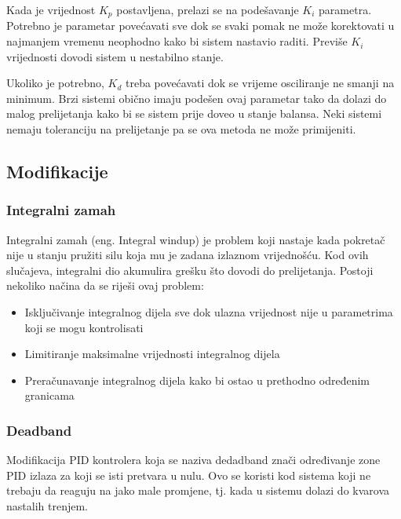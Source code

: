 \documentclass[../Document.tex]{subfiles}
\begin{document}

\noindent Kada je vrijednost $K_p$ postavljena, prelazi se na podešavanje $K_i$ parametra. Potrebno je parametar povećavati sve dok se svaki pomak ne može korektovati u najmanjem vremenu neophodno kako bi sistem nastavio raditi. Previše $K_i$ vrijednosti dovodi sistem u nestabilno stanje.


\noindent Ukoliko je potrebno, $K_d$ treba povećavati dok se vrijeme osciliranje ne smanji na minimum. Brzi sistemi obično imaju podešen ovaj parametar tako da dolazi do malog prelijetanja kako bi se sistem prije doveo u stanje balansa. Neki sistemi nemaju toleranciju na prelijetanje pa se ova metoda ne može primijeniti.


\subsection{Modifikacije}

\subsubsection{Integralni zamah}
Integralni zamah (eng. Integral windup) je problem koji nastaje kada pokretač nije u stanju pružiti silu koja mu je zadana izlaznom vrijednošću. Kod ovih slučajeva, integralni dio akumulira grešku što dovodi do prelijetanja. Postoji nekoliko načina da se riješi ovaj problem:

\begin{itemize}
    \item Isključivanje integralnog dijela sve dok ulazna vrijednost nije u parametrima koji se mogu kontrolisati
    \item Limitiranje maksimalne vrijednosti integralnog dijela
    \item Preračunavanje integralnog dijela kako bi ostao u prethodno određenim granicama
\end{itemize}

\subsubsection{Deadband}
Modifikacija PID kontrolera koja se naziva dedadband znači određivanje zone PID izlaza za koji se isti pretvara u nulu. Ovo se koristi kod sistema koji ne trebaju da reaguju na jako male promjene, tj. kada u sistemu dolazi do kvarova nastalih trenjem.
\end{document}
